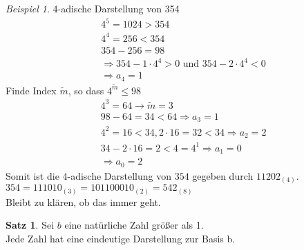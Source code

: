\documentclass[12pt,a4paper,titlepage]{article} %
\theoremstyle{definition}
\newtheorem{satz}{Satz}[subsection]
\theoremstyle{remark}
\newtheorem*{bsp}{Beispiel}
\begin{document}
	\begin{bsp}
		4-adische Darstellung von 354\\
		\begin{align*}			
			&4^5 = 1024 > 354\\
			&4^4 = 256 < 354\\
			&354 - 256 = 98\\
			&\Rightarrow 354 -1 \cdot 4^4 > 0 \text{ und } 354 - 2 \cdot 4^4 < 0\\
			&\Rightarrow a_4 = 1
		\end{align*}
		Finde Index \(\tilde{m}\), so dass \(4^{\tilde{m}} \leq 98\)			
		\begin{align*}			
			&4^3 = 64 \rightarrow \tilde{m} = 3\\
			&98 - 64 = 34 < 64 \Rightarrow a_3 = 1\\
			&4^2 = 16 < 34, 2 \cdot 16 = 32 < 34 \Rightarrow a_2 = 2\\
			&34 - 2 \cdot 16 = 2 < 4 = 4^1 \Rightarrow a_1 = 0\\
			&\Rightarrow a_0 = 2
		\end{align*}
		Somit ist die 4-adische Darstellung von \(354\) gegeben durch \(11202_{(4)}\).\\
		\(354 = 111010_{(3)} = 101100010_{(2)} = 542_{(8)}\)\\
		Bleibt zu klären, ob das immer geht.
	\end{bsp}
	\begin{satz}
		Sei \(b\) eine natürliche Zahl größer als 1.\\
		Jede Zahl hat eine eindeutige Darstellung zur Basis b.
	\end{satz}
\end{document}
